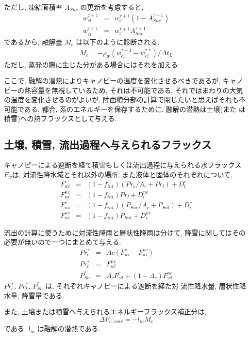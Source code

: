 ただし, 凍結面積率 $A_{Snc}$ の更新を考慮すると, 
\begin{eqnarray}
 w_{cl}^{\tau+1} &=& w_{c}^{\tau+1} (1-A_{Snc}^{\tau+1}) \\
 w_{ci}^{\tau+1} &=& w_{c}^{\tau+1} A_{Snc}^{\tau+1} 
\end{eqnarray}
であるから, 融解量 $M_c$ は以下のように診断される. 
\begin{eqnarray}
 M_c = - \rho_w ( w_{ci}^{\tau+1} - w_{ci}^{**} ) / \Delta t_L
\end{eqnarray}
ただし, 蒸発の際に生じた分がある場合にはそれを加える. 

ここで, 融解の潜熱によりキャノピーの温度を変化させるべきであるが, キャノ
ピーの熱容量を無視しているため, それは不可能である. それではまわりの大気
の温度を変化させるのがよいが, 陸面積分部の計算で閉じたいと思えばそれも不
可能である. 都合, 系のエネルギーを保存するために, 融解の潜熱は土壌(また
は積雪)への熱フラックスとして与える. 

\subsection{土壌, 積雪, 流出過程へ与えられるフラックス}

キャノピーによる遮断を経て積雪もしくは流出過程に与えられる水フラックス
$F_w$は, 対流性降水域とそれ以外の場所, また液体と固体のそれぞれについて, 
\begin{eqnarray}
 F_{wl}^{c} &=& (1-f_{int})( Pr_c / A_c + Pr_l ) + D_{l}^{c} \\
 F_{wl}^{nc} &=&(1-f_{int}) Pr_l + D_{l}^{nc} \\
 F_{wi}^{c} &=& (1-f_{int})( P_{Snc} / A_c + P_{Snl} ) + D_{i}^{c} \\
 F_{wi}^{nc} &=&(1-f_{int}) P_{Snl} + D_{i}^{nc}
\end{eqnarray}

流出の計算に使うために対流性降雨と層状性降雨は分けて, 降雪に関してはその
必要が無いので一つにまとめて与える. 
\begin{eqnarray}
 Pr_c^* &=& Ac ( F_{wl}^{c} - F_{wl}^{nc} ) \\
 Pr_l^* &=& F_{wl}^{nc} \\
 P_{Sn}^* &=& A_c F_{wl}^{c} + (1-A_c) F_{wl}^{nc}
\end{eqnarray}
$Pr_c^*$, $Pr_l^*$, $P_{Sn}^*$ は, それぞれキャノピーによる遮断を経た対
流性降水量, 層状性降水量, 降雪量である. 

また, 土壌または積雪へ与えられるエネルギーフラックス補正分は, 
\begin{equation}
 \Delta F_{c,conv} = - l_m M_c
\end{equation}
である. $l_m$ は融解の潜熱である. 


